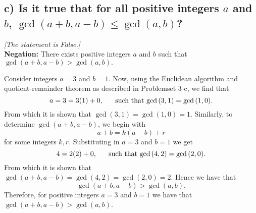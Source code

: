 \documentclass[11pt, letterpaper]{article}
\begin{document}
\subsection*{c) Is it true that for all positive integers $a$ and $b$, $\gcd{(a+b,a-b)}\leq \gcd{(a,b)}$?}
{\large\it |The statement is False.|}\\[0.25cm]
{\bf Negation:} There exists positive integers $a$ and $b$ such that $\gcd{(a+b,a-b)}>\gcd{(a,b)}.$
\begin{prf}
    Consider integers $a=3$ and $b=1$. Now, using the Euclidean algorithm and quotient-remainder theorem as described in Problemset 3-c, we find that
    \[a=3=3(1)+0\text{, \indent such that $\gcd{(3,1)}=\gcd{(1,0)}$.}\]
    From which it is shown that $\gcd{(3,1)}=\gcd{(1,0)}=1$. Similarly, to determine  $\gcd{(a+b,a-b)}$, we begin with
    \[a+b=k(a-b)+r\]
    for some integers $k,r$. Substituting in $a=3$ and $b=1$ we get 
    \[4=2(2)+0\text{, \indent such that $\gcd{(4,2)}=\gcd{(2,0)}$.}\]
    From which it is shown that $\gcd{(a+b,a-b)}=\gcd{(4,2)}=\gcd{(2,0)}=2$. Hence we have that
    \[\gcd{(a+b,a-b)}>\gcd{(a,b)}\text{.}\]
    Therefore, for positive integers $a=3$ and $b=1$ we have that $\gcd{(a+b,a-b)}>\gcd{(a,b)}$.
\end{prf}
\end{document}
